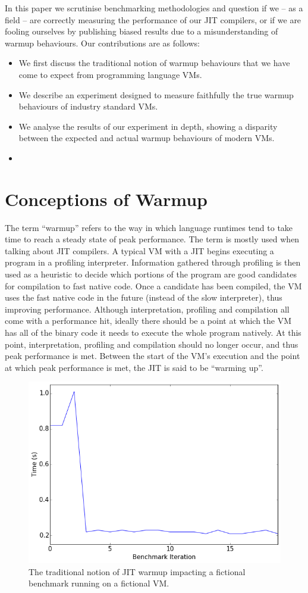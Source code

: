 \documentclass[10pt,preprint]{sigplanconf}
\begin{document}
In this paper we scrutinise benchmarking methodologies and question if we --
as a field -- are correctly measuring the performance of our JIT compilers,
or if we are fooling ourselves by publishing biased results due to a
misunderstanding of warmup behaviours. Our contributions are as follows:

\begin{itemize}
\item We first discuss the traditional notion of warmup behaviours that we have
come to expect from programming language VMs.
\item We describe an experiment designed to measure faithfully the true
warmup behaviours of industry standard VMs.
\item We analyse the results of our experiment in depth, showing a disparity
between the expected and actual warmup behaviours of modern VMs.
\item {}
\end{itemize}


\section{Conceptions of Warmup}
\label{sec:warmup}

The term ``warmup'' refers to the way in which language runtimes tend to take
time to reach a steady state of peak performance. The term is mostly used when
talking about JIT compilers. A typical VM
with a JIT begins executing a program in a profiling interpreter. Information
gathered through profiling is then used as a heuristic to decide which portions
of the program are good candidates for compilation to fast native code. Once a
candidate has been compiled, the VM uses the fast native code in the future
(instead of the slow interpreter), thus improving performance.  Although
interpretation, profiling and compilation all come with a performance hit,
ideally there should be a point at which the VM has all of the binary code it
needs to execute the whole program natively. At this point, interpretation,
profiling and compilation should no longer occur, and thus peak performance is
met. Between the start of the VM's execution and the point at which peak
performance is met, the JIT is said to be ``warming up''.

\begin{figure}[h!]
\centering
\includegraphics[width=.4\textwidth]{img/trad}
\caption{The traditional notion of JIT warmup impacting a fictional
benchmark running on a fictional VM.}
\label{fig:trad}
\end{figure}
\end{document}
